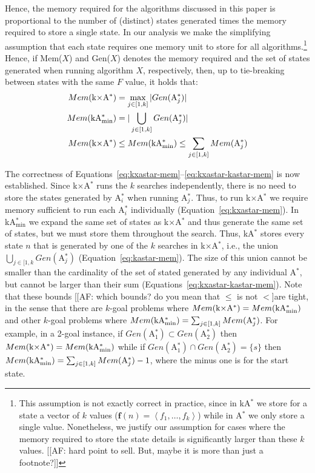 \documentclass[twoside,11pt]{article}
\newcommand{\astar}{A$^*$\xspace}
\newcommand{\kastar}{kA$^*$\xspace}
\newcommand{\kastarvar}[1]{\textup{kA}$^*_{#1}$\xspace}
\newcommand{\kastarmin}{\kastarvar{\min}}
\newcommand{\kxastar}{k$\times$A$^*$\xspace}
\newcommand{\astari}[1]{A$^*_{#1}$\xspace}
\newcommand{\tuple}[1]{\ensuremath{\left \langle #1 \right \rangle }}
\newcommand{\vect}[1]{\mathbf{#1}}
\begin{document}
Hence, the memory required for the algorithms discussed in this paper is proportional to the number of (distinct) states generated times the memory required to store a single state.
In our analysis we make the simplifying assumption that each state requires one memory unit to store for all algorithms.\footnote{This assumption is not exactly correct in practice, since in \kastar we store for a state a vector of $k$ values ($\vect{f}(n)=\tuple{f_1,\ldots,f_k}$) while in \astar we only store a single value.
Nonetheless, we justify our assumption for cases where the memory required to store the state details is significantly larger than these $k$ values.  [[AF: hard point to sell. But, maybe it is more than just a footnote?]]}
Hence, if Mem($X$) and Gen($X$) denotes the memory required and the set of states generated when running algorithm $X$, respectively, then, up to tie-breaking between states with the same $F$ value, it holds that:
\begin{align}
Mem(\text{\kxastar})&=\max_{j\in [1,k]}| Gen(\text{\astari{j}})| \label{eq:kxastar-mem}\\
Mem(\text{\kastarmin})&=|\bigcup_{j\in [1,k]} Gen(\text{\astari{j}})| \label{eq:kastar-mem}\\
Mem(\text{\kxastar})&\leq Mem(\text{\kastarmin}) \leq \sum_{j\in[1,k]} Mem(\text{\astari{j}}) \label{eq:kxastar-kastar-mem}
\end{align}

The correctness of Equations~\eqref{eq:kxastar-mem}--\eqref{eq:kxastar-kastar-mem} is now established.
Since \kxastar runs the $k$ searches independently, there is no need to store the states generated by \astari{i} when running \astari{j}.
Thus, to run \kxastar we require memory sufficient to run each \astari{i} individually (Equation~\eqref{eq:kxastar-mem}).
In \kastarmin we expand the same set of states as \kxastar and thus generate the same set of states, but we must store them throughout the search.
Thus, \kastar stores every state $n$ that is  generated by one of the $k$ searches in \kxastar, i.e., the union $\bigcup_{j\in[1,k}Gen(\text{\astari{j}})$ (Equation~\eqref{eq:kastar-mem}).
The size of this union cannot be smaller than the cardinality of the set of stated generated by any individual \astar, but cannot be larger than their sum (Equations~\eqref{eq:kxastar-kastar-mem}).
Note that these bounds [[AF: which bounds? do you mean that $\leq$ is not $<$]are tight, in the sense that there are $k$-goal problems where $Mem(\text{\kxastar}) = Mem(\text{\kastarmin})$ and other $k$-goal problems where $Mem(\text{\kastarmin}) = \sum_{j\in[1,k]} Mem(\text{\astari{j}})$.
For example, in a 2-goal instance, if $Gen(\text{\astari{1}})\subset Gen(\text{\astari{2}})$ then $Mem(\text{\kxastar}) = Mem(\text{\kastarmin})$ while if $Gen(\text{\astari{1}})\cap Gen(\text{\astari{2}})=\{s\}$ then $Mem(\text{\kastarmin}) = \sum_{j\in[1,k]} Mem(\text{\astari{j}})-1$, where the minus one is for the start state. %
\end{document}
